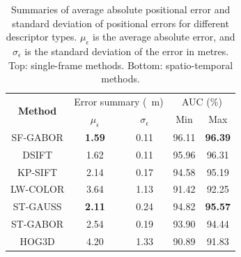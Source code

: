 \begin{table}[!h]
\centering

    \begin{tabular}{ c c c c c }
    \hline
     \multirow{2}{*}{\bf Method}  & \multicolumn{2}{c}{Error summary (\SI{}{m})} & \multicolumn{2}{c}{AUC (\%)}\\ \cline{2-5}    
    & $\mu_{\epsilon}$ & $\sigma_{\epsilon}$ & Min & Max \\ \hline

    SF-GABOR       & \textbf{1.59}             & 0.11             & 96.11   & \textbf{96.39}   \\ \hline
	DSIFT           & 1.62              & 0.11  & 95.96   & 96.31   \\ \hline 

	KP-SIFT           & 2.14              & 0.17  & 94.58   & 95.19   \\ \hline 

	LW-COLOR           & 3.64              & 1.13  & 91.42   & 92.25   \\ \hline \hline


	
	ST-GAUSS        & \textbf{2.11}              & 0.24 & 94.82   & \textbf{95.57}   \\ \hline
    ST-GABOR       & 2.54              & 0.19 & 93.90   & 94.44   \\ \hline

    HOG3D         & 4.20              & 1.33              & 90.89   & 91.83   \\ \hline
    \end{tabular}


\caption{Summaries of average absolute positional error and standard deviation of positional errors for different descriptor types. $\mu_{\epsilon}$ is the average absolute error, and $\sigma_{\epsilon}$ is the standard deviation of the error in metres. Top: single-frame methods. Bottom: spatio-temporal methods.}
\label{Table:summaries}
\end{table}


